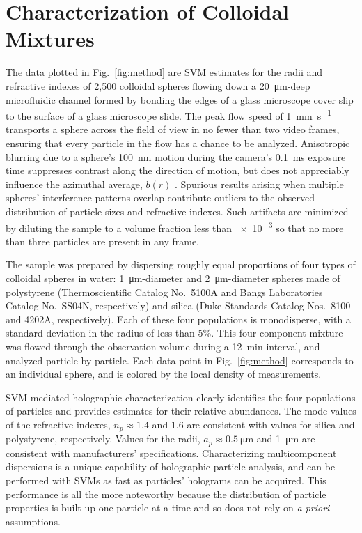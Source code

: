 \documentclass[10pt,letterpaper]{article}
\begin{document}
\section{Characterization of Colloidal Mixtures}

The data plotted in Fig.~\ref{fig:method} are
SVM estimates for the radii and refractive indexes of 2,500 
colloidal spheres flowing down a \SI{20}{\um}-deep 
microfluidic channel formed by bonding
the edges of a glass microscope cover slip to the surface of a
glass microscope slide.
The peak flow speed of 
\SI{1}{\mm\per\second} transports  
a sphere across the field of view in no fewer than  
two video frames, ensuring that every particle in the  
flow has a chance to be analyzed.  
Anisotropic blurring due to a sphere's \SI{100}{\nm} 
motion during the camera's \SI{0.1}{\ms} exposure time  
suppresses contrast along the direction of motion, but does not  
appreciably influence the azimuthal average, $b(r)$ \cite{dixon11}.  
Spurious results arising when 
multiple spheres' interference patterns overlap
contribute outliers to the observed
distribution of particle sizes and refractive indexes.
Such artifacts are minimized by diluting the sample to a volume
fraction less than \num{e-3} so that 
no more than three particles are present in any frame.

The sample was prepared by dispersing roughly equal proportions 
of four types of colloidal spheres in water:
\SI{1}{\um}-diameter and \SI{2}{\um}-diameter 
spheres made of polystyrene (Thermoscientific Catalog No.\ 5100A and 
Bangs Laboratories Catalog No.\ SS04N, respectively) and silica (Duke
Standards Catalog Nos.\ 8100 and 4202A, respectively).
Each of these four populations is monodisperse, with a
standard deviation in the radius of less than 5\%.
This four-component mixture was 
flowed through the
observation volume during a \SI{12}{\minute} interval,
and analyzed particle-by-particle.
Each data point in Fig.~\ref{fig:method} corresponds to an individual 
sphere, and is colored by the local density of measurements.

SVM-mediated holographic characterization clearly identifies
the four populations of particles and provides estimates for their relative abundances.
The mode values of the refractive indexes, $n_p \approx \num{1.4}$ 
and \num{1.6} are consistent with values for silica and polystyrene,
respectively.  Values for the radii, $a_p \approx \SI{0.5}{\um}$
and \SI{1}{\um} are consistent with manufacturers'
specifications.
Characterizing multicomponent dispersions
is a unique capability of holographic particle analysis, and
can be performed with SVMs as fast as 
particles' holograms can be acquired.
This performance is all the more noteworthy because the
distribution of particle properties is built up one particle at a time
and so does not rely on \emph{a priori} assumptions.
\end{document}

